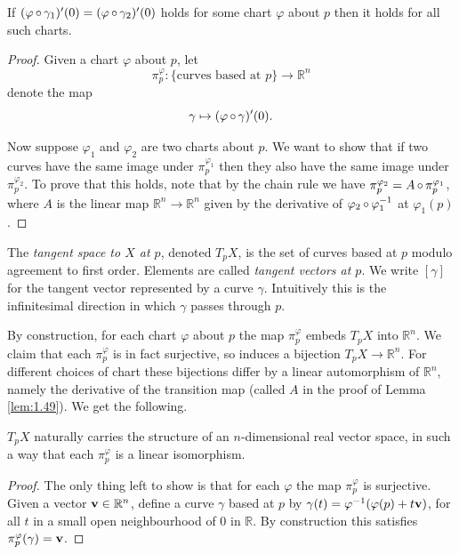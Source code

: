 \documentclass[a4paper,11pt]{article}
\begin{document}
	\begin{lem} \label{lem:1.49}
		If $(\varphi \operatorname{\circ} \gamma_1)' (0) = (\varphi \operatorname{\circ} \gamma_2)' (0)$ holds for some chart $\varphi$ about $p$ then it holds for all such charts. 
	\end{lem}
	\begin{proof}
		Given a chart $\varphi$ about $p$, let
		\[
			\pi^\varphi_p : \{\text{curves based at } p\} \to \mathbb{R}^n
		\]
		denote the map
		\[
			\gamma \mapsto (\varphi \operatorname{\circ} \gamma)' (0).
		\]
		
		Now suppose $\varphi_1$ and $\varphi_2$ are two charts about $p$. We want to show that if two curves have the same image under $\pi_p^{\varphi_1}$ then they also have the same image under $\pi_p^{\varphi_2}$. To prove that this holds, note that by the chain rule we have $\pi_p^{\varphi_2} = A \operatorname{\circ} \pi_p^{\varphi_1}$, where $A$ is the linear map $\mathbb{R}^n \to \mathbb{R}^n$ given by the derivative of $\varphi_2 \operatorname{\circ} \varphi_1^{-1}$ at $\varphi_1(p)$. 
	\end{proof}

	\begin{defi}
		The \emph{tangent space to $X$ at $p$}, denoted $T_p X$, is the set of curves based at $p$ modulo agreement to first order. Elements are called \emph{tangent vectors at $p$}. We write $[\gamma]$ for the tangent vector represented by a curve $\gamma$. Intuitively this is the infinitesimal direction in which $\gamma$ passes through $p$.
	\end{defi}

	By construction, for each chart $\varphi$ about $p$ the map $\pi_p^\varphi$ embeds $T_p X$ into $\mathbb{R}^n$. We claim that each $\pi_p^\varphi$ is in fact surjective, so induces a bijection $T_p X \to \mathbb{R}^n$. For different choices of chart these bijections differ by a linear automorphism of $\mathbb{R}^n$, namely the derivative of the transition map (called $A$ in the proof of Lemma \ref{lem:1.49}). We get the following.

	\begin{prop}
		$T_p X$ naturally carries the structure of an $n$-dimensional real vector space, in such a way that each $\pi_p^\varphi$ is a linear isomorphism.
	\end{prop}
	\begin{proof}
		The only thing left to show is that for each $\varphi$ the map $\pi_p^\varphi$ is surjective. Given a vector $\vb v \in \mathbb{R}^n$, define a curve $\gamma$ based at $p$ by $\gamma(t) = \varphi^{-1}(\varphi(p) + t \vb v)$, for all $t$ in a small open neighbourhood of $0$ in $\mathbb{R}$. By construction this satisfies $\pi_p^\varphi (\gamma) = \vb v$. 
	\end{proof}
\end{document}
